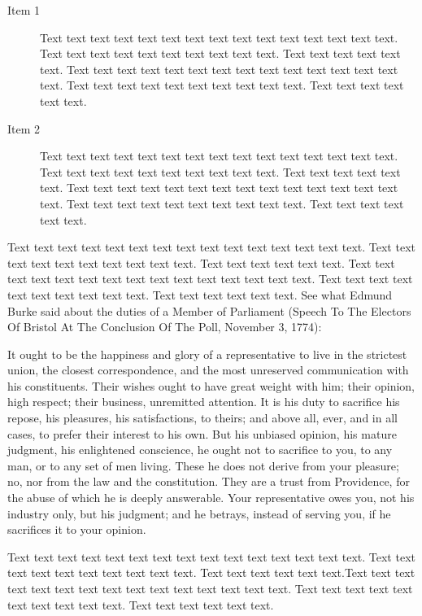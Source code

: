 \begin{description}
\item[Item 1] Text text text text text text text text text text text text text text text. Text text text text text text text text text text. Text text text text text text. Text text text text text text text text text text text text text text text. Text text text text text text text text text text. Text text text text text text.
\item[Item 2] Text text text text text text text text text text text text text text text. Text text text text text text text text text text. Text text text text text text. Text text text text text text text text text text text text text text text. Text text text text text text text text text text. Text text text text text text.
\end{description}

Text text text text text text text text text text text text text text text. Text text text text text text text text text text. Text text text text text text. Text text text text text text text text text text text text text text text. Text text text text text text text text text text. Text text text text text text. See what Edmund Burke said about the duties of a Member of Parliament (Speech To The Electors Of Bristol At The Conclusion Of The Poll, November 3, 1774):

\begin{quotesmall}
It ought to be the happiness and glory of a representative to live in the strictest union, the closest correspondence, and the most unreserved communication with his constituents. Their wishes ought to have great weight with him; their opinion, high respect; their business, unremitted attention. It is his duty to sacrifice his repose, his pleasures, his satisfactions, to theirs; and above all, ever, and in all cases, to prefer their interest to his own. But his unbiased opinion, his mature judgment, his enlightened conscience, he ought not to sacrifice to you, to any man, or to any set of men living. These he does not derive from your pleasure; no, nor from the law and the constitution. They are a trust from Providence, for the abuse of which he is deeply answerable. Your representative owes you, not his industry only, but his judgment; and he betrays, instead of serving you, if he sacrifices it to your opinion.
\end{quotesmall}

Text text text text text text text text text text text text text text text. Text text text text text text text text text text. Text text text text text text.Text text text text text text text text text text text text text text text. Text text text text text text text text text text. Text text text text text text.

